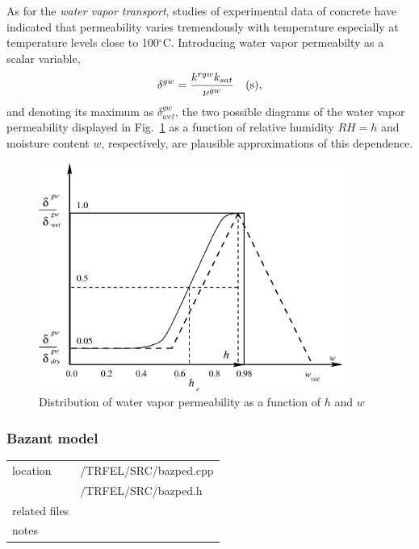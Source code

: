 As for the {\it water vapor transport}, studies of experimental data of concrete have indicated that permeability 
varies tremendously with temperature especially at temperature levels close to 100$^\circ$C. 
Introducing water vapor permeabilty as a scalar variable,
\begin{eqnarray}
\delta^{gw} = \frac{k^{rgw}k_{sat}}{\nu^{gw}} \quad ({\rm s}),
\end{eqnarray}
and denoting its maximum as $\delta_{wet}^{gw}$, the two possible diagrams of the water vapor permeability displayed 
in Fig.~\ref{s_shape} as a function of relative humidity  $RH = h$ and moisture content $w$, respectively, 
are plausible approximations of this dependence.
\begin{figure}[h!]
\begin{center}
\includegraphics[angle=0, width=10cm]{PS/s_shape.eps}
\caption{Distribution of water vapor permeability as a function of $h$ and $w$}
\label{s_shape}
\end{center}
\end{figure}

\subsubsection{Bazant model}

\begin{center}
\begin{tabular}{|l|l|}
\hline
location & /TRFEL/SRC/bazped.cpp\\
         & /TRFEL/SRC/bazped.h
\\ \hline
related files &
\\ \hline
notes & 
\\ \hline
\end{tabular}
\end{center}

